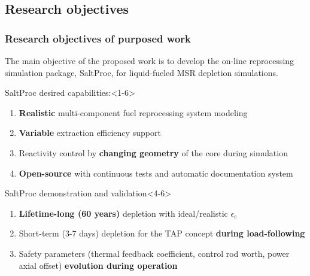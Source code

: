 \subsection{Research objectives}

\begin{frame}
  \frametitle{Research objectives of purposed work}
                  \vspace*{-0.05in}
      The main objective of the proposed work is to develop the on-line  reprocessing simulation package, SaltProc, for liquid-fueled MSR depletion simulations.
     \begin{block}{SaltProc desired capabilities:}<1-6>
         \begin{enumerate}
                \item \textbf{Realistic} multi-component fuel 
                reprocessing 
                system modeling
                \item \textbf{Variable} extraction efficiency support
                \item<2-6> Reactivity control by \textbf{changing geometry} of 
                the core during simulation
                \item<3-6> \textbf{Open-source} with continuous tests and 
                automatic documentation system 
         \end{enumerate}
      \end{block}
            \vspace{-0.1in}
	\begin{block}{SaltProc demonstration and validation}<4-6>
		\begin{enumerate}
			\item<4-6> \textbf{Lifetime-long (60 years)} depletion with ideal/realistic $\epsilon_e$
			\item<5-6> Short-term (3-7 days) depletion for the \gls{TAP} concept \textbf{during load-following}
			\item<6> Safety parameters (thermal feedback coefficient, control rod worth, power 
			axial offset) \textbf{evolution during operation}
		\end{enumerate}
	\end{block}
\end{frame}
